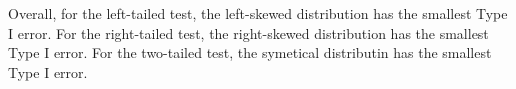\documentclass{article}\usepackage[]{graphicx}\usepackage[]{xcolor}
\begin{document}
\begin{enumerate}
\begin{enumerate}
    Overall, for the left-tailed test, the left-skewed distribution has the smallest Type I error. For the right-tailed test, the right-skewed distribution has the smallest Type I error. For the two-tailed test, the symetical distributin has the smallest Type I error.  
  \end{enumerate}
\end{enumerate}

\end{document}
